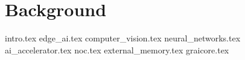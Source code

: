 \chapter{Background}
{intro.tex}
{edge_ai.tex}
{computer_vision.tex}
{neural_networks.tex}
{ai_accelerator.tex}
{noc.tex}
{external_memory.tex}
{graicore.tex}

